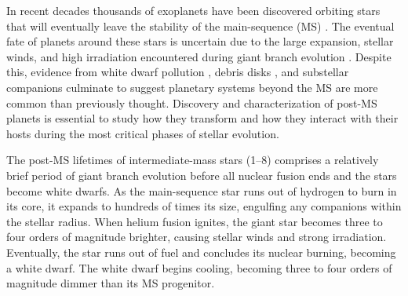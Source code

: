\documentclass[twocolumn,linenumbers]{aastex631}
\begin{document}
In recent decades thousands of exoplanets have been discovered orbiting stars that will eventually leave the stability of the main-sequence (MS) \citep{akesonNASAExoplanetArchive2013}. The eventual fate of planets around these stars is uncertain due to the large expansion, stellar winds, and high irradiation encountered during giant branch evolution \citep{verasPostmainsequencePlanetarySystem2016}. Despite this, evidence from white dwarf pollution \citep{juraExternallyPollutedWhite2007,xuSpitzerObservationsWhite2012}, debris disks \citep{deruyterKeplerianDiscsPostAGB2006,zuckermanAncientPlanetarySystems2010,koesterFrequencyPlanetaryDebris2014}, and substellar companions \citep[e.g.,][]{luhmanDiscoveryCandidateCoolest2011,vanderburgGiantPlanetCandidate2020,blackmanJovianAnalogueOrbiting2021} culminate to suggest planetary systems beyond the MS are more common than previously thought. Discovery and characterization of post-MS planets is essential to study how they transform and how they interact with their hosts during the most critical phases of stellar evolution.

The post-MS lifetimes of intermediate-mass stars (\qtyrange{1}{8}{\solarmass}) comprises a relatively brief period of giant branch evolution before all nuclear fusion ends and the stars become white dwarfs. As the main-sequence star runs out of hydrogen to burn in its core, it expands to hundreds of times its size, engulfing any companions within the stellar radius. When helium fusion ignites, the giant star becomes three to four orders of magnitude brighter, causing stellar winds and strong irradiation. Eventually, the star runs out of fuel and concludes its nuclear burning, becoming a white dwarf. The white dwarf begins cooling, becoming three to four orders of magnitude dimmer than its MS progenitor.
\end{document}
